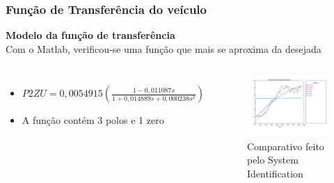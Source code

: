 \begin{frame}
\frametitle{Função de Transferência do veículo}
\textbf{Modelo da função de transferência}\\
Com o Matlab, verificou-se uma função que mais se aproxima da desejada
	
\begin{columns}
 		
 	\vspace{-0.5cm}
 	\begin{itemize}
 	\item $P2ZU = 0,0054915(\frac{1-0,011087s}{1+0,014889s+0,000238s^2})$
 	\item A função contém 3 polos e 1 zero
 	\end{itemize}
 	

	\begin{figure}[th]
	\centering
	\captionsetup{width=0.9\textwidth,font=footnotesize,textfont=bf}
	\includegraphics[width=\linewidth,keepaspectratio]{Figuras/Comparativo.pdf}
	\caption{Comparativo feito pelo System Identification}				
	\end{figure}
	
\end{columns}
\end{frame}

